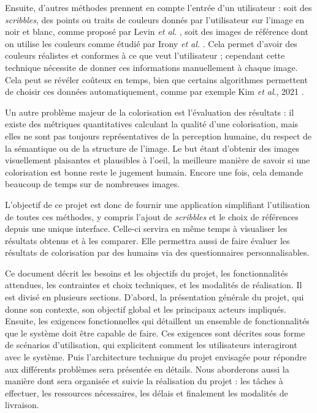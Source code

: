 \documentclass{article}
\begin{document}
Ensuite, d'autres méthodes prennent en compte l'entrée d'un utilisateur : soit des \emph{scribbles}, des points ou traits de couleurs donnés par l’utilisateur sur l’image
en noir et blanc, comme proposé par Levin \emph{et al}. \cite{10.1145/1015706.1015780}, soit des images de référence dont on utilise les couleurs comme étudié par Irony \emph{et al.} \cite{10.5555/2383654.2383683}.
Cela permet d'avoir des couleurs réalistes et conformes à ce que veut l'utilisateur ; cependant cette technique nécessite de donner ces informations manuellement à chaque image. Cela peut se révéler coûteux en temps, bien que certains algorithmes permettent de choisir ces données automatiquement, comme par exemple Kim \emph{et al}., 2021 \cite{color-Bleeding}.

Un autre problème majeur de la colorisation est l'évaluation des résultats :
il existe des métriques quantitatives calculant la qualité d'une colorisation, mais elles ne sont pas toujours représentatives de la perception humaine, du respect de la sémantique ou de la structure de l'image.
Le but étant d'obtenir des images visuellement plaisantes et plausibles à l'oeil, la meilleure manière de savoir si une colorisation est bonne reste le jugement humain. Encore une fois, cela demande beaucoup de temps sur de nombreuses images.

L'objectif de ce projet est donc de fournir une application simplifiant l'utilisation de toutes ces méthodes, y compris l'ajout de \emph{scribbles} et le choix de références depuis une unique interface.
Celle-ci servira en même temps à visualiser les résultats obtenus et à les comparer.
Elle permettra aussi de faire évaluer les résultats de colorisation par des humains via des questionnaires personnalisables.

Ce document décrit les besoins et les objectifs du projet, les fonctionnalités attendues, les
contraintes et choix techniques, et les modalités de réalisation. Il est divisé en plusieurs sections. D'abord, la présentation générale du
projet, qui donne son contexte, son objectif global et les principaux acteurs impliqués. 
Ensuite, les exigences fonctionnelles qui détaillent un ensemble de fonctionnalités que le système doit être capable de faire.
Ces exigences sont décrites sous forme de scénarios d'utilisation, qui explicitent comment les utilisateurs interagiront avec le système.
Puis l'architecture technique du projet envisagée pour répondre aux différents problèmes sera présentée en détails.
Nous aborderons aussi la manière dont sera organisée et suivie la réalisation du projet : les tâches à effectuer, les ressources nécessaires, les délais et finalement les modalités de livraison.
\pagebreak
\end{document}
